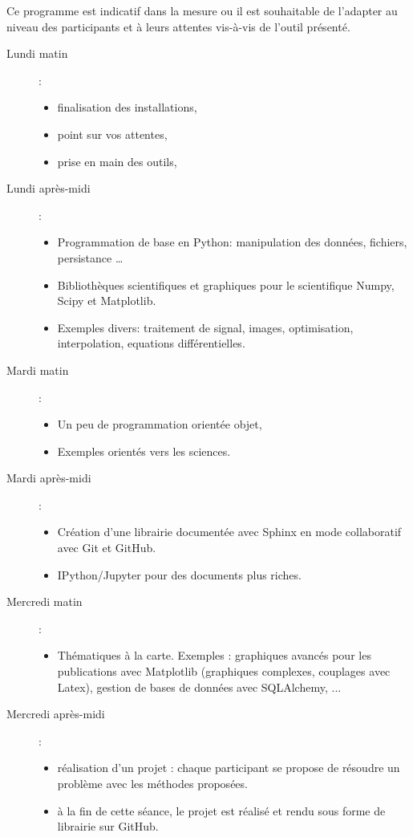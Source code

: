 \documentclass[a4paper,10pt,twoside]{article}
\begin{document}
Ce programme est indicatif dans la mesure ou il est souhaitable de l'adapter au niveau des participants et à leurs attentes vis-à-vis de l'outil présenté.
\begin{description}
\item[Lundi matin]: 
\begin{itemize}
\item finalisation des installations, 
\item point sur vos attentes,
\item prise en main des outils,
\end{itemize}

\item[Lundi après-midi]: 
\begin{itemize}
\item Programmation de base en Python: manipulation des données, fichiers, persistance \ldots 
\item Bibliothèques scientifiques et graphiques pour le scientifique Numpy, Scipy et Matplotlib. 
\item Exemples divers: traitement de signal, images, optimisation, interpolation, equations différentielles.
\end{itemize}

\item[Mardi matin]: 
\begin{itemize}
\item Un peu de programmation orientée objet,
\item Exemples orientés vers les sciences.
\end{itemize}

\item[Mardi après-midi]: 
\begin{itemize}
\item Création d'une librairie documentée avec Sphinx en mode collaboratif avec Git et GitHub.
\item IPython/Jupyter pour des documents plus riches.
\end{itemize}

\item[Mercredi matin]: 
\begin{itemize}
\item Thématiques à la carte. Exemples : graphiques avancés pour les publications avec Matplotlib (graphiques complexes, couplages avec Latex), gestion de bases de données avec SQLAlchemy, ... 
\end{itemize}

\item[Mercredi après-midi]: 
\begin{itemize}
\item réalisation d'un projet : chaque participant se propose de résoudre un problème avec les méthodes proposées. 
\item à la fin de cette séance, le projet est réalisé et rendu sous forme de librairie sur GitHub.
\end{itemize}
\end{description}
\end{document}
